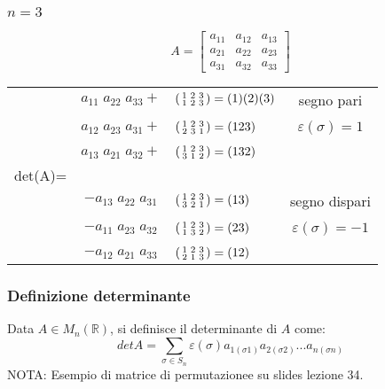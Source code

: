 \subsubsection{$n=3$}
\[A=\begin{bmatrix}a_{11}& a_{12} & a_{13} \\ a_{21} & a_{22} & a_{23} \\ a_{31} & a_{32} & a_{33}\end{bmatrix}\]
\begin{center}
\begin{tabular}{c c | l| c}
  & $a_{11}\;a_{22}\;a_{33}+$ & $\begin{psmallmatrix}1&2&3\\1&2&3\end{psmallmatrix} = (1)(2)(3)$&segno pari\\
  &&&\\
  & $a_{12}\;a_{23}\;a_{31}+$ & $\begin{psmallmatrix}1&2&3\\2&3&1\end{psmallmatrix} = (123)$&$\varepsilon(\sigma)=1$\\
  &&&\\
  & $a_{13}\;a_{21}\;a_{32}+$ & $\begin{psmallmatrix}1&2&3\\3&1&2\end{psmallmatrix} = (132)$&\\\cline{3-4}
  det(A)= &&\\
  & $-a_{13}\;a_{22}\;a_{31}$ & $\begin{psmallmatrix}1&2&3\\3&2&1\end{psmallmatrix} = (13)$&segno dispari\\
  &&&\\
  & $-a_{11}\;a_{23}\;a_{32}$ & $\begin{psmallmatrix}1&2&3\\1&3&2\end{psmallmatrix} = (23)$&$\varepsilon(\sigma)=-1$\\
  &&&\\
  & $-a_{12}\;a_{21}\;a_{33}$ & $\begin{psmallmatrix}1&2&3\\2&1&3\end{psmallmatrix} = (12)$&\\
\end{tabular}
\end{center}

\subsubsection{Definizione determinante}
Data $A\in M_n(\mathbb{R})$, si definisce il determinante di $A$ come:
\[detA=\sum_{\sigma\in S_n}\varepsilon(\sigma)a_{1(\sigma 1)}a_{2(\sigma 2)}...a_{n(\sigma n)}\]
NOTA: Esempio di matrice di permutazionee su slides lezione 34.

